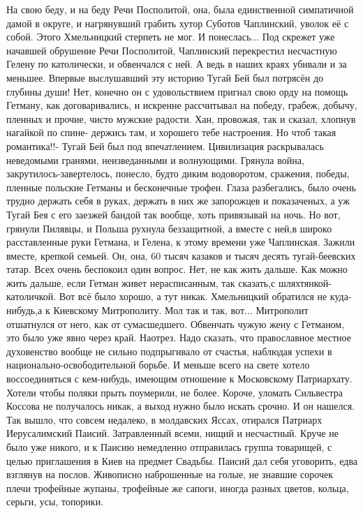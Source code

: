 На свою беду, и на беду Речи Посполитой, она, была единственной симпатичной дамой в округе, и нагрянувший грабить хутор Суботов Чаплинский, уволок её с собой.
Этого Хмельницкий стерпеть не мог.
И понеслась...
Под скрежет уже начавшей обрушение Речи Посполитой, Чаплинский перекрестил несчастную Гелену по католически, и обвенчался с ней.
А ведь в наших краях убивали и за меньшее.
Впервые выслушавший эту историю Тугай Бей был потрясён до глубины души!
Нет, конечно он с удовольствием пригнал свою орду на помощь Гетману, как договаривались, и искренне рассчитывал на победу, грабеж, добычу, пленных и прочие, чисто мужские радости.
Хан, провожая, так и сказал, хлопнув нагайкой по спине- держись там, и хорошего тебе настроения.
Но чтоб такая романтика!!- Тугай Бей был под впечатлением.
Цивилизация раскрывалась неведомыми гранями, неизведанными и волнующими.
Грянула война, закрутилось-завертелось, понесло, будто диким водоворотом, сражения, победы, пленные польские Гетманы и бесконечные трофеи.
Глаза разбегались, было очень трудно держать себя в руках, держать в них же запорожцев и показаченых, а уж Тугай Бея с его заезжей бандой так вообще, хоть привязывай на ночь.
Но вот, грянули Пилявцы, и Польша рухнула беззащитной, а вместе с ней,в широко расставленные руки Гетмана, и Гелена, к этому времени уже Чаплинская.
Зажили вместе, крепкой семьей.
Он, она, 60 тысяч казаков и тысяч десять тугай-беевских татар.
Всех очень беспокоил один вопрос.
Нет, не как жить дальше.
Как можно жить дальше, если Гетман живет нерасписанным, так сказать,с шляхтянкой-католичкой.
Вот всё было хорошо, а тут никак.
Хмельницкий обратился не куда-нибудь,а к Киевскому Митрополиту.
Мол так и так, вот...
Митрополит отшатнулся от него, как от сумасшедшего.
Обвенчать чужую жену с Гетманом, это было уже явно через край.
Наотрез.
Надо сказать, что православное местное духовенство вообще не сильно подпрыгивало от счастья, наблюдая успехи в национально-освободительной борьбе.
И меньше всего на свете хотело воссоединяться с кем-нибудь, имеющим отношение к Московскому Патриархату.
Хотели чтобы поляки прыть поумерили, не более.
Короче, уломать Сильвестра Коссова не получалось никак, а выход нужно было искать срочно.
И он нашелся.
Так вышло, что совсем недалеко, в молдавских Яссах, отирался Патриарх Иерусалимский Паисий.
Затравленный всеми, нищий и несчастный.
Круче не было уже никого, и к Паисию немедленно отправилась группа товарищей, с целью приглашения в Киев на предмет Свадьбы.
Паисий дал себя уговорить, едва взглянув на послов.
Живописно наброшенные на голые, не знавшие сорочек плечи трофейные жупаны, трофейные же сапоги, иногда разных цветов, кольца, серьги, усы, топорики.
